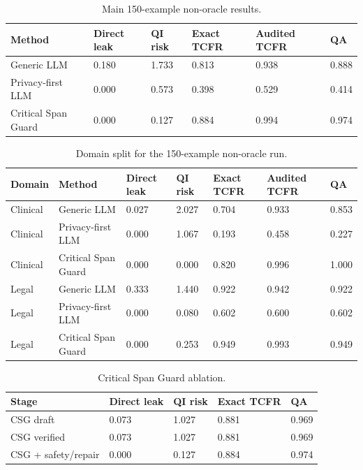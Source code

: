 \begin{table}[t]
\centering
\begin{tabular}{llllll}
\toprule
Method & Direct leak & QI risk & Exact TCFR & Audited TCFR & QA \\
\midrule
Generic LLM & 0.180 & 1.733 & 0.813 & 0.938 & 0.888 \\
Privacy-first LLM & 0.000 & 0.573 & 0.398 & 0.529 & 0.414 \\
Critical Span Guard & 0.000 & 0.127 & 0.884 & 0.994 & 0.974 \\
\bottomrule
\end{tabular}
\caption{Main 150-example non-oracle results.}
\end{table}

\begin{table}[t]
\centering
\begin{tabular}{lllllll}
\toprule
Domain & Method & Direct leak & QI risk & Exact TCFR & Audited TCFR & QA \\
\midrule
Clinical & Generic LLM & 0.027 & 2.027 & 0.704 & 0.933 & 0.853 \\
Clinical & Privacy-first LLM & 0.000 & 1.067 & 0.193 & 0.458 & 0.227 \\
Clinical & Critical Span Guard & 0.000 & 0.000 & 0.820 & 0.996 & 1.000 \\
Legal & Generic LLM & 0.333 & 1.440 & 0.922 & 0.942 & 0.922 \\
Legal & Privacy-first LLM & 0.000 & 0.080 & 0.602 & 0.600 & 0.602 \\
Legal & Critical Span Guard & 0.000 & 0.253 & 0.949 & 0.993 & 0.949 \\
\bottomrule
\end{tabular}
\caption{Domain split for the 150-example non-oracle run.}
\end{table}

\begin{table}[t]
\centering
\begin{tabular}{lllll}
\toprule
Stage & Direct leak & QI risk & Exact TCFR & QA \\
\midrule
CSG draft & 0.073 & 1.027 & 0.881 & 0.969 \\
CSG verified & 0.073 & 1.027 & 0.881 & 0.969 \\
CSG + safety/repair & 0.000 & 0.127 & 0.884 & 0.974 \\
\bottomrule
\end{tabular}
\caption{Critical Span Guard ablation.}
\end{table}

